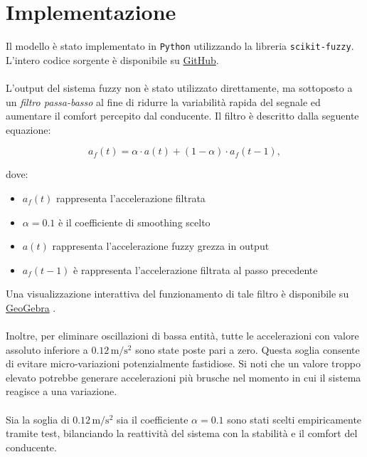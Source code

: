 \chapter{Implementazione}

Il modello è stato implementato in \texttt{Python} utilizzando la libreria \texttt{scikit-fuzzy}.  
L'intero codice sorgente è disponibile su \href{https://github.com/Leso246/FuzzyACC}{GitHub}.
\\\\
\noindent L'output del sistema fuzzy non è stato utilizzato direttamente, ma sottoposto a un \emph{filtro passa-basso} 
al fine di ridurre la variabilità rapida del segnale ed aumentare il comfort percepito dal conducente.  
Il filtro è descritto dalla seguente equazione:

\[
a_{f}(t) = \alpha \cdot a(t) + (1 - \alpha) \cdot a_{f}(t-1),
\]

\noindent dove:
\begin{itemize}
    \item $a_{f}(t)$ rappresenta l'accelerazione filtrata
    \item $\alpha = 0.1$ è il coefficiente di smoothing scelto
    \item $a(t)$ rappresenta l'accelerazione fuzzy grezza in output
    \item $a_{f}(t-1)$ è rappresenta l'accelerazione filtrata al passo precedente
\end{itemize}
Una visualizzazione interattiva del funzionamento di tale filtro è disponibile 
su \href{https://www.geogebra.org/m/tb88mqrm}{GeoGebra} \cite{geogebraEWMA}.
\\\\
\noindent Inoltre, per eliminare oscillazioni di bassa entità, tutte le accelerazioni con valore assoluto inferiore a $0.12 \, \mathrm{m/s^2}$ 
sono state poste pari a zero.  
Questa soglia consente di evitare micro-variazioni potenzialmente fastidiose. Si noti che un valore troppo elevato potrebbe
generare accelerazioni più brusche nel momento in cui il sistema reagisce a una variazione.
\\\\
\noindent Sia la soglia di $0.12 \, \mathrm{m/s^2}$ sia il coefficiente $\alpha = 0.1$ sono stati scelti empiricamente tramite test, 
bilanciando la reattività del sistema con la stabilità e il comfort del conducente.

